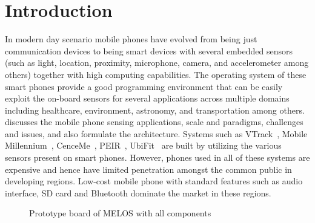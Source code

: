 \documentclass[10pt]{sigplan-proc-varsize}
\newcommand{\melos}{MELOS }
\begin{document}
\section{Introduction}
  \label{sec:intro}
%

In modern day scenario mobile phones have evolved from being just communication devices to being smart devices with several embedded sensors (such as light, location, proximity, microphone, camera, and accelerometer among others) together with high computing capabilities. The operating system of these smart phones provide a good programming environment that can be easily exploit the on-board sensors for several applications across multiple domains including healthcare, environment, astronomy, and transportation among others. \cite{mobilesurvey} discusses the mobile phone sensing applications, scale and paradigms, challenges and issues, and also formulate the architecture. Systems such as VTrack~\cite{vtrack}, Mobile Millennium~\cite{mobilemillennium}, CenceMe~\cite{CenceMe}, PEIR~\cite{peir}, UbiFit~\cite{UbiFit} are built by utilizing the various sensors present on smart phones. However, phones used in all of these systems are expensive and hence have limited penetration amongst the common public in developing regions. Low-cost mobile phone with standard features such as audio interface, SD card and Bluetooth dominate the market in these regions. 

\begin{figure}
\centering
{}
\caption{Prototype board of \melos with all components}
\label{fig:melosboard}
\end{figure}
\end{document}
